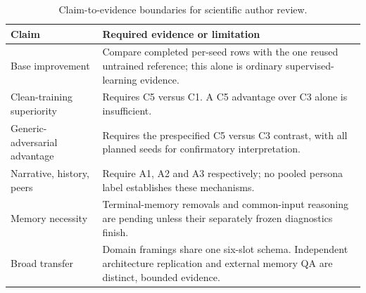 \begin{table}[ht]\centering\caption{Claim-to-evidence boundaries for scientific author review.}\begin{tabular}{p{}p{}}\toprule Claim & Required evidence or limitation\\\midrule
Base improvement & Compare completed per-seed rows with the one reused untrained reference; this alone is ordinary supervised-learning evidence.\\
Clean-training superiority & Requires C5 versus C1. A C5 advantage over C3 alone is insufficient.\\
Generic-adversarial advantage & Requires the prespecified C5 versus C3 contrast, with all planned seeds for confirmatory interpretation.\\
Narrative, history, peers & Require A1, A2 and A3 respectively; no pooled persona label establishes these mechanisms.\\
Memory necessity & Terminal-memory removals and common-input reasoning are pending unless their separately frozen diagnostics finish.\\
Broad transfer & Domain framings share one six-slot schema. Independent architecture replication and external memory QA are distinct, bounded evidence.\\
\bottomrule\end{tabular}\end{table}
